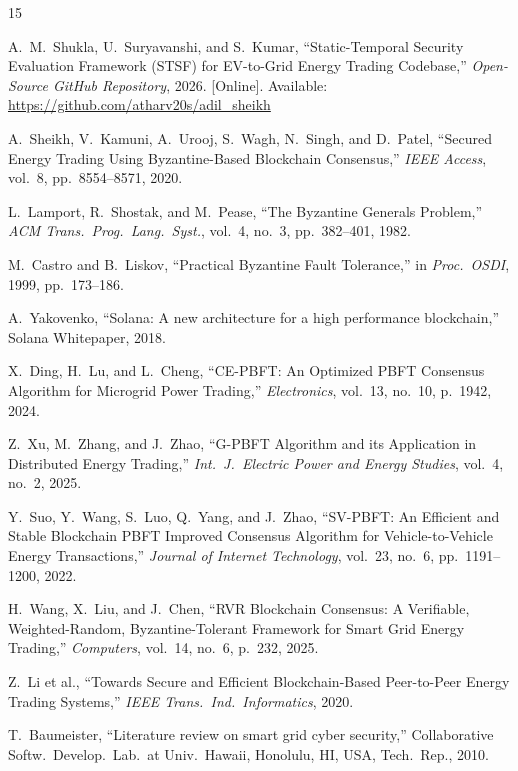 \documentclass[10pt,twocolumn,journal]{IEEEtran}
\begin{document}
\begin{thebibliography}{15}

A.~M.~Shukla, U.~Suryavanshi, and S.~Kumar, ``Static-Temporal Security Evaluation Framework (STSF) for EV-to-Grid Energy Trading Codebase,'' \emph{Open-Source GitHub Repository}, 2026. [Online]. Available: \url{https://github.com/atharv20s/adil_sheikh}


A.~Sheikh, V.~Kamuni, A.~Urooj, S.~Wagh, N.~Singh, and D.~Patel,
``Secured Energy Trading Using Byzantine-Based Blockchain Consensus,''
\emph{IEEE Access}, vol.~8, pp.~8554--8571, 2020.

L.~Lamport, R.~Shostak, and M.~Pease,
``The Byzantine Generals Problem,''
\emph{ACM Trans.\ Prog.\ Lang.\ Syst.}, vol.~4, no.~3, pp.~382--401, 1982.

M.~Castro and B.~Liskov,
``Practical Byzantine Fault Tolerance,''
in \emph{Proc.\ OSDI}, 1999, pp.~173--186.

A.~Yakovenko,
``Solana: A new architecture for a high performance blockchain,''
Solana Whitepaper, 2018.

X.~Ding, H.~Lu, and L.~Cheng,
``CE-PBFT: An Optimized PBFT Consensus Algorithm for Microgrid Power Trading,''
\emph{Electronics}, vol.~13, no.~10, p.~1942, 2024.

Z.~Xu, M.~Zhang, and J.~Zhao,
``G-PBFT Algorithm and its Application in Distributed Energy Trading,''
\emph{Int.\ J.\ Electric Power and Energy Studies}, vol.~4, no.~2, 2025.

Y.~Suo, Y.~Wang, S.~Luo, Q.~Yang, and J.~Zhao,
``SV-PBFT: An Efficient and Stable Blockchain PBFT Improved Consensus Algorithm for Vehicle-to-Vehicle Energy Transactions,''
\emph{Journal of Internet Technology}, vol.~23, no.~6, pp.~1191--1200, 2022.

H.~Wang, X.~Liu, and J.~Chen,
``RVR Blockchain Consensus: A Verifiable, Weighted-Random, Byzantine-Tolerant Framework for Smart Grid Energy Trading,''
\emph{Computers}, vol.~14, no.~6, p.~232, 2025.

Z.~Li et al.,
``Towards Secure and Efficient Blockchain-Based Peer-to-Peer Energy Trading Systems,''
\emph{IEEE Trans.\ Ind.\ Informatics}, 2020.

T.~Baumeister,
``Literature review on smart grid cyber security,''
Collaborative Softw.\ Develop.\ Lab.\ at Univ.\ Hawaii, Honolulu, HI, USA, Tech.\ Rep., 2010.


\end{thebibliography}
\end{document}
